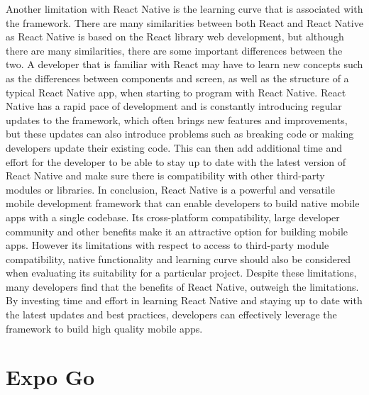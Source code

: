 Another limitation with React Native is the learning curve that is associated with the framework. There are many similarities between both React and React Native as React Native is based on the React library web development, but although there are many similarities, there are some important differences between the two. A developer that is familiar with React may have to learn new concepts such as the differences between components and screen, as well as the structure of a typical React Native app, when starting to program with React Native. React Native has a rapid pace of development and is constantly introducing regular updates to the framework, which often brings new features and improvements, but these updates can also introduce problems such as breaking code or making developers update their existing code. This can then add additional time and effort for the developer to be able to stay up to date with the latest version of React Native and make sure there is compatibility with other third-party modules or libraries.
\newline \newline
In conclusion, React Native is a powerful and versatile mobile development framework that can enable developers to build native mobile apps with a single codebase. Its cross-platform compatibility, large developer community and other benefits make it an attractive option for building mobile apps. However its limitations with respect to access to third-party module compatibility, native functionality and learning curve should also be considered when evaluating its suitability for a particular project. Despite these limitations, many developers find that the benefits of React Native, outweigh the limitations. By investing time and effort in learning React Native and staying up to date with the latest updates and best practices, developers can effectively leverage the framework to build high quality mobile apps.
       
\section{Expo Go}

